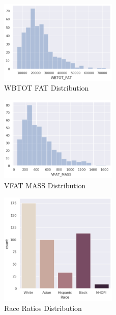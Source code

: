 \begin{figure}[!htb]
        \caption{WBTOT FAT Distribution}
        \centering
        \includegraphics[width=0.5\textwidth]{images/wbtot_fat.png}
\end{figure}


\begin{figure}[!htb]
        \caption{VFAT MASS Distribution}
        \centering
        \includegraphics[width=0.5\textwidth]{images/vfat_mass.png}
\end{figure}

\begin{figure}[!htb]
        \caption{Race Ratios Distribution}
        \centering
        \includegraphics[width=0.5\textwidth]{images/race_ratios.png}
\end{figure}

